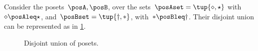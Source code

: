 \begin{example}
    Consider the posets~$\posA,\posB$, over the sets~$\posAset=\tup{\diamond, \star}$ with~$\diamond \posAleq \star$, and~$\posBset=\tup{\dagger,\ast}$, with~$\ast \posBleq \dagger$.
    Their disjoint union can be represented as in \cref{fig:poset-coproduct}.

    \begin{figure}[h!]
        \centering
        \caption{Disjoint union of posets.}
        \label{fig:poset-coproduct}
    \end{figure}
\end{example}


